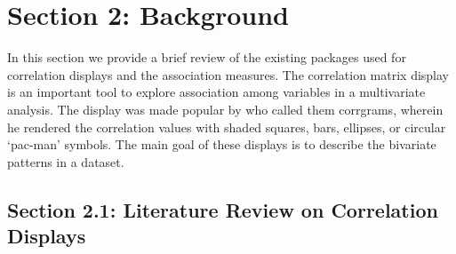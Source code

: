 \hypertarget{section-2-background}{%
\section{Section 2: Background}\label{section-2-background}}

In this section we provide a brief review of the existing packages used
for correlation displays and the association measures. The correlation
matrix display is an important tool to explore association among
variables in a multivariate analysis. The display was made popular by
\citet{friendly2002corrgrams} who called them corrgrams, wherein he
rendered the correlation values with shaded squares, bars, ellipses, or
circular `pac-man' symbols. The main goal of these displays is to
describe the bivariate patterns in a dataset.

\hypertarget{section-2.1-literature-review-on-correlation-displays}{%
\subsection{Section 2.1: Literature Review on Correlation
Displays}\label{section-2.1-literature-review-on-correlation-displays}}

